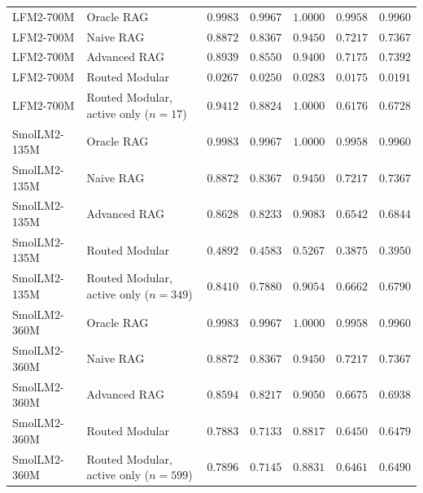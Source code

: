 \documentclass[10pt]{article}
\begin{document}
\begin{table}[t]
\begin{tabular}{llccccc}
\midrule
LFM2-700M & Oracle RAG & $0.9983$ & $0.9967$ & $1.0000$ & $0.9958$ & $0.9960$ \\
LFM2-700M & Naive RAG & $0.8872$ & $0.8367$ & $0.9450$ & $0.7217$ & $0.7367$ \\
LFM2-700M & Advanced RAG & $0.8939$ & $0.8550$ & $0.9400$ & $0.7175$ & $0.7392$ \\
LFM2-700M & Routed Modular & $0.0267$ & $0.0250$ & $0.0283$ & $0.0175$ & $0.0191$ \\
LFM2-700M & Routed Modular, active only ($n=17$) & $0.9412$ & $0.8824$ & $1.0000$ & $0.6176$ & $0.6728$ \\
\midrule
SmolLM2-135M & Oracle RAG & $0.9983$ & $0.9967$ & $1.0000$ & $0.9958$ & $0.9960$ \\
SmolLM2-135M & Naive RAG & $0.8872$ & $0.8367$ & $0.9450$ & $0.7217$ & $0.7367$ \\
SmolLM2-135M & Advanced RAG & $0.8628$ & $0.8233$ & $0.9083$ & $0.6542$ & $0.6844$ \\
SmolLM2-135M & Routed Modular & $0.4892$ & $0.4583$ & $0.5267$ & $0.3875$ & $0.3950$ \\
SmolLM2-135M & Routed Modular, active only ($n=349$) & $0.8410$ & $0.7880$ & $0.9054$ & $0.6662$ & $0.6790$ \\
\midrule
SmolLM2-360M & Oracle RAG & $0.9983$ & $0.9967$ & $1.0000$ & $0.9958$ & $0.9960$ \\
SmolLM2-360M & Naive RAG & $0.8872$ & $0.8367$ & $0.9450$ & $0.7217$ & $0.7367$ \\
SmolLM2-360M & Advanced RAG & $0.8594$ & $0.8217$ & $0.9050$ & $0.6675$ & $0.6938$ \\
SmolLM2-360M & Routed Modular & $0.7883$ & $0.7133$ & $0.8817$ & $0.6450$ & $0.6479$ \\
SmolLM2-360M & Routed Modular, active only ($n=599$) & $0.7896$ & $0.7145$ & $0.8831$ & $0.6461$ & $0.6490$ \\
\bottomrule
\end{tabular}
\end{table}
\end{document}
